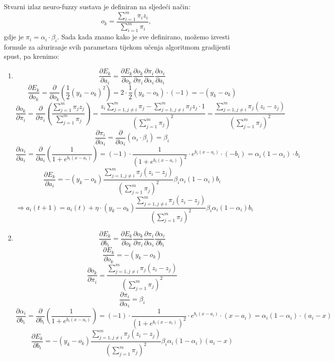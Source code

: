 \documentclass[times, utf8, seminar]{fer}
\begin{document}
Stvarni izlaz neuro-fuzzy sustava je definiran na sljedeći način:
\[o_k = \frac{\sum_{i=1}^{m} \pi_iz_i}{\sum_{i=1}^{m} \pi_i},\]
gdje je $\pi_i = \alpha_i \cdot \beta_i$. Sada kada znamo kako je sve definirano, možemo izvesti formule za ažuriranje svih parametara tijekom učenja algoritmom gradijenti spust, pa krenimo:
\begin{enumerate}
    \item 
        \[\frac{\partial E_k}{\partial a_i} = \frac{\partial E_k}{\partial o_k} \frac{\partial o_k}{\partial \pi_i}     \frac{\partial \pi_i}{\partial \alpha_i} \frac{\partial \alpha_i}{\partial a_i}\]
        \[\frac{\partial E_k}{\partial o_k} = \frac{\partial}{\partial o_k}(\frac{1}{2}(y_k-o_k)^2) = 2 \cdot \frac{1}{2}(y_k-o_k) \cdot (-1) = -(y_k-o_k)\]
        \[\frac{\partial o_k}{\partial \pi_i} = \frac{\partial}{\partial \pi_i}(\frac{\sum_{j=1}^{m} \pi_jz_j}{\sum_{j=1}^{m} \pi_j}) = \frac{z_i \sum_{j=1,j \neq i}^{m} \pi_j - \sum_{j=1,j \neq i}^{m} \pi_jz_j \cdot 1}{(\sum_{j=1}^{m} \pi_j)^2} = \frac{\sum_{j=1,j \neq i}^{m} \pi_j(z_i-z_j)}{(\sum_{j=1}^{m} \pi_j)^2}\]
        \[\frac{\partial \pi_i}{\partial \alpha_i} = \frac{\partial}{\partial \alpha_i}(\alpha_i \cdot \beta_i) = \beta_i\]
        \[\frac{\partial \alpha_i}{\partial a_i} = \frac{\partial}{\partial a_i}(\frac{1}{1 + e^{b_i(x-a_i)}}) = (-1) \cdot \frac{1}{(1 + e^{b_i(x-a_i)})^2} \cdot e^{b_i(x-a_i)} \cdot (-b_i) = \alpha_i(1-\alpha_i) \cdot b_i\]
        \[\frac{\partial E_k}{\partial a_i} = -(y_k-o_k)\frac{\sum_{j=1,j \neq i}^{m} \pi_j(z_i-z_j)}{(\sum_{j=1}^{m} \pi_j)^2}\beta_i\alpha_i(1-\alpha_i)b_i\]
        \[\Longrightarrow a_i(t+1) = a_i(t) + \eta \cdot (y_k-o_k)\frac{\sum_{j=1,j \neq i}^{m} \pi_j(z_i-z_j)}{(\sum_{j=1}^{m} \pi_j)^2}\beta_i\alpha_i(1-\alpha_i)b_i\]
    \item 
        \[\frac{\partial E_k}{\partial b_i} = \frac{\partial E_k}{\partial o_k} \frac{\partial o_k}{\partial \pi_i}     \frac{\partial \pi_i}{\partial \alpha_i} \frac{\partial \alpha_i}{\partial b_i}\]
        \[\frac{\partial E_k}{\partial o_k} = -(y_k-o_k)\]
        \[\frac{\partial o_k}{\partial \pi_i} = \frac{\sum_{j=1,j \neq i}^{m} \pi_j(z_i-z_j)}{(\sum_{j=1}^{m} \pi_j)^2}\]
        \[\frac{\partial \pi_i}{\partial \alpha_i} = \beta_i\]
        \[\frac{\partial \alpha_i}{\partial b_i} = \frac{\partial}{\partial b_i}(\frac{1}{1 + e^{b_i(x-a_i)}}) = (-1) \cdot \frac{1}{(1 + e^{b_i(x-a_i)})^2} \cdot e^{b_i(x-a_i)} \cdot (x-a_i) = \alpha_i(1-\alpha_i) \cdot (a_i-x)\]
        \[\frac{\partial E_k}{\partial b_i} = -(y_k-o_k)\frac{\sum_{j=1,j \neq i}^{m} \pi_j(z_i-z_j)}{(\sum_{j=1}^{m} \pi_j)^2}\beta_i\alpha_i(1-\alpha_i)(a_i-x)\]

\end{enumerate}
\end{document}
